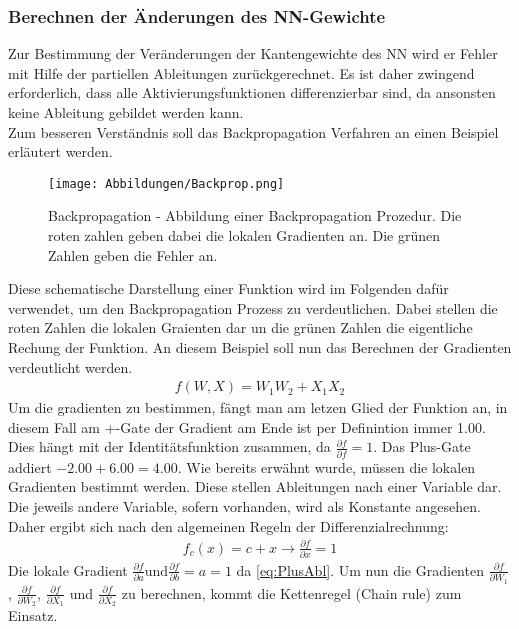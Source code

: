\subsubsection{Berechnen der Änderungen des NN-Gewichte}
Zur Bestimmung der Veränderungen der Kantengewichte des NN wird er Fehler mit Hilfe der partiellen Ableitungen zurückgerechnet. Es ist daher zwingend erforderlich, dass alle Aktivierungsfunktionen differenzierbar sind, da ansonsten keine Ableitung gebildet werden kann.\\
Zum besseren Verständnis soll das Backpropagation Verfahren an einen Beispiel erläutert werden.
\begin{figure}[H]
	\begin{center}
		\texttt{[image: Abbildungen/Backprop.png]}
		\label{fig:Backpropagation}
		\caption[Backpropagation]{Backpropagation - Abbildung einer Backpropagation Prozedur. Die roten zahlen geben dabei die lokalen Gradienten an. Die grünen Zahlen geben die Fehler an.}
	\end{center}
\end{figure}
Diese schematische Darstellung einer Funktion wird im Folgenden dafür verwendet, um den Backpropagation Prozess zu verdeutlichen. Dabei stellen die roten Zahlen die lokalen Graienten dar un die grünen Zahlen die eigentliche Rechung der Funktion. An diesem Beispiel soll nun das Berechnen der Gradienten verdeutlicht werden.\\
\begin{align}
	f(W, X) = W_{1}W_{2} + X_{1}X_{2}
\end{align}
Um die gradienten zu bestimmen, fängt man am letzen Glied der Funktion an, in diesem Fall am +-Gate der Gradient am Ende ist per Definintion immer 1.00. Dies hängt mit der Identitätsfunktion zusammen, da $\frac{\partial f}{\partial f} = 1$. Das Plus-Gate addiert $-2.00 + 6.00 = 4.00$. Wie bereits erwähnt wurde, müssen die lokalen Gradienten bestimmt werden. Diese stellen Ableitungen nach einer Variable dar. Die jeweils andere Variable, sofern vorhanden, wird als Konstante angesehen. Daher ergibt sich nach den algemeinen Regeln der Differenzialrechnung: 
\begin{align}
	f_{c}(x) = c + x \longrightarrow \frac{\partial f}{\partial x} = 1
	\label{eq:PlusAbl}
\end{align}
Die lokale Gradient $\frac{\partial f}{\partial a} \text{und} \frac{\partial f}{\partial b} = a = 1$ da \ref{eq:PlusAbl}.
Um nun die Gradienten $\frac{\partial f}{\partial W_1}$, $\frac{\partial f}{\partial W_2}$, $\frac{\partial f}{\partial X_1}$ und $\frac{\partial f}{\partial X_2}$ zu berechnen, kommt die Kettenregel (Chain rule) zum Einsatz.
